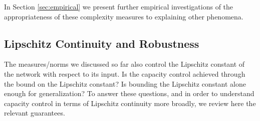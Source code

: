 \documentclass{article}
\begin{document}
In Section \ref{sec:empirical} we present further empirical
investigations of the appropriateness of these complexity measures to
explaining other phenomena.


 
 




\subsection{Lipschitz Continuity and Robustness}\label{subsec:lipschitz}
The measures/norms we discussed so far also control the Lipschitz
constant of the network with respect to its input.  Is the capacity
control achieved through the bound on the Lipschitz constant?  Is bounding the
Lipschitz constant alone enough for generalization?  To answer these
questions, and in order to understand capacity control in terms of
Lipschitz continuity more broadly, we review here the relevant guarantees.
\end{document}
